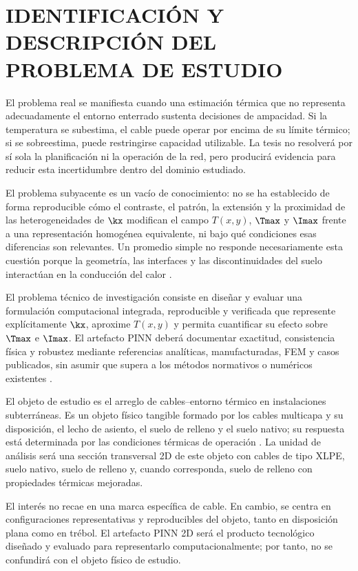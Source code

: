 \section{IDENTIFICACIÓN Y DESCRIPCIÓN DEL PROBLEMA DE ESTUDIO}
\label{sec:planteamiento-problema}

El problema real se manifiesta cuando una estimación térmica que no representa adecuadamente el entorno enterrado sustenta decisiones de ampacidad. Si la temperatura se subestima, el cable puede operar por encima de su límite térmico; si se sobreestima, puede restringirse capacidad utilizable. La tesis no resolverá por sí sola la planificación ni la operación de la red, pero producirá evidencia para reducir esta incertidumbre dentro del dominio estudiado.

El problema subyacente es un vacío de conocimiento: no se ha establecido de forma reproducible cómo el contraste, el patrón, la extensión y la proximidad de las heterogeneidades de $\kx$ modifican el campo $T(x,y)$, $\Tmax$ y $\Imax$ frente a una representación homogénea equivalente, ni bajo qué condiciones esas diferencias son relevantes. Un promedio simple no responde necesariamente esta cuestión porque la geometría, las interfaces y las discontinuidades del suelo interactúan en la conducción del calor \parencites[4--6]{enescu2021}[3--4,93--99]{cigre2025}.

El problema técnico de investigación consiste en diseñar y evaluar una formulación computacional integrada, reproducible y verificada que represente explícitamente $\kx$, aproxime $T(x,y)$ y permita cuantificar su efecto sobre $\Tmax$ e $\Imax$. El artefacto PINN deberá documentar exactitud, consistencia física y robustez mediante referencias analíticas, manufacturadas, FEM y casos publicados, sin asumir que supera a los métodos normativos o numéricos existentes \parencites{iec60287}{iec60853}[3--4,93--99]{cigre2025}[686--690]{raissi2019}.

El objeto de estudio es el arreglo de cables--entorno térmico en instalaciones subterráneas. Es un objeto físico tangible formado por los cables multicapa y su disposición, el lecho de asiento, el suelo de relleno y el suelo nativo; su respuesta está determinada por las condiciones térmicas de operación \parencites[3--6]{enescu2021}{ieee442}[1,10]{kim2025}. La unidad de análisis será una sección transversal 2D de este objeto con cables de tipo XLPE, suelo nativo, suelo de relleno y, cuando corresponda, suelo de relleno con propiedades térmicas mejoradas.

El interés no recae en una marca específica de cable. En cambio, se centra en configuraciones representativas y reproducibles del objeto, tanto en disposición plana como en trébol. El artefacto PINN 2D será el producto tecnológico diseñado y evaluado para representarlo computacionalmente; por tanto, no se confundirá con el objeto físico de estudio.

